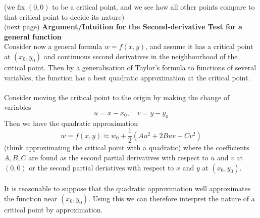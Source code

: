 \documentclass{report}
\begin{document}
(we fix $(0,0)$ to be a critical point, and we see how all other points compare to that critical point to decide
its nature)\\
(next page)
\newpage
\noindent\textbf{Argument/Intuition for the Second-derivative Test for a general function}\\
Consider now a general formula $w=f(x,y)$, and assume it has a critical point at $(x_0,y_0)$ and continuous second
derivatives in the neighbourhood of the critical point.
Then by a generalisation of Taylor's formula to functions
of several variables, the function has a best quadratic approximation at the critical point.\\
\vspace{1mm}\\
Consider moving the critical point to the origin by making the change of variables
\begin{equation*}
u=x-x_0,\quad v=y-y_0
\end{equation*}
Then we have the quadratic approximation
\begin{equation*}
w=f(x,y)\approx w_0+\frac{1}{2}(Au^2+2Buv+Cv^2)
\end{equation*}
(think approximating the critical point with a quadratic)
where the coefficients $A,B,C$ are found as the second partial derivatives with respect to $u$ and $v$ at $(0,0)$ or
the second partial deriatives with respect to $x$ and $y$ at $(x_0,y_0)$.\\
\vspace{1mm}\\
It is reasonable to suppose that the quadratic approximation well approximates the function near $(x_0,y_0)$. 
Using this we can therefore interpret the nature of a critical point by approximation.
\newpage
\end{document}

